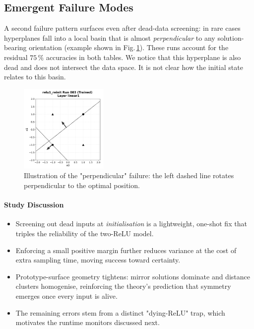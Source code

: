 \subsection*{Emergent Failure Modes}
A second failure pattern surfaces even after dead-data screening:
in rare cases hyperplanes fall into a local basin that is almost
\emph{perpendicular} to any solution-bearing orientation (example shown in Fig.\,\ref{fig:reinit-bad}).
These runs account for the residual $75\,\%$ accuracies in both tables. 
We notice that this hyperplane is also dead and does not intersect the data space.
It is not clear how the initial state relates to this basin.

\begin{figure}[ht]
  \centering
  \includegraphics[width=0.38\textwidth]{relu1/figs/reinit_bad_example.pdf}
  \caption{Illustration of the "perpendicular" failure: the left dashed
           line rotates perpendicular to the optimal position.}
  \label{fig:reinit-bad}
\end{figure}

\paragraph{Study Discussion}
\begin{itemize}
  \item Screening out dead inputs at \emph{initialisation} is a
        lightweight, one-shot fix that triples the reliability of the
        two-ReLU model.
  \item Enforcing a small positive margin further reduces variance at the
        cost of extra sampling time, moving success toward certainty.
  \item Prototype-surface geometry tightens: mirror solutions dominate
        and distance clusters homogenise, reinforcing the theory's
        prediction that symmetry emerges once every input is alive.
  \item The remaining errors stem from a distinct "dying-ReLU" 
        trap, which motivates the runtime monitors discussed next.
\end{itemize}

\hrulefill
